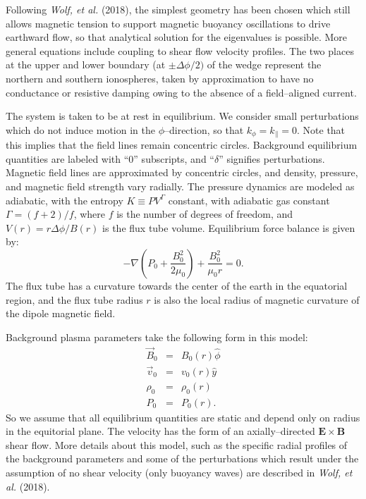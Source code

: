 \documentclass[a4paper,openany,12pt]{book}
\begin{document}
Following \emph{Wolf, et al.} (2018), the simplest geometry has been chosen which still allows magnetic tension to support magnetic buoyancy oscillations to drive earthward flow, so that analytical solution for the eigenvalues is possible. More general equations include coupling to shear flow velocity profiles. The two places at the upper and lower boundary (at $\pm\Delta\phi/2)$ of the wedge represent the northern and southern ionospheres, taken by approximation to have no conductance or resistive damping owing to the absence of a field--aligned current.

The system is taken to be at rest in equilibrium. We consider small perturbations which do not induce motion in the $\phi$--direction, so that $k_\phi=k_\|=0$. Note that this implies that the field lines remain concentric circles. Background equilibrium quantities are labeled with ``0'' subscripts, and ``$\delta$'' signifies perturbations. Magnetic field lines are approximated by concentric circles, and density, pressure, and magnetic field strength vary radially. The pressure dynamics are modeled as adiabatic, with the entropy $K\equiv PV^\Gamma$ constant, with adiabatic gas constant $\Gamma=(f+2)/f$, where $f$ is the number of degrees of freedom, and $V(r)=r\Delta\phi/B(r)$ is the flux tube volume. Equilibrium force balance is given by:
\begin{equation}
-\nabla\left(P_0+\frac{B_0^2}{2\mu_0}\right)+\frac{B_0^2}{\mu_0r}=0.\label{E9.67}
\end{equation}
The flux tube has a curvature towards the center of the earth in the equatorial region, and the flux tube radius $r$ is also the local radius of magnetic curvature of the dipole magnetic field.

Background plasma parameters take the following form in this model:
\begin{eqnarray}
\vec B_0&=&B_0(r)\widehat\phi\label{E9.68}\\
\vec v_0&=&v_0(r)\widehat y\label{E9.69}\\
\rho_0&=&\rho_0(r)\label{E9.70}\\
P_0&=&P_0(r).\label{E9.71}
\end{eqnarray}
So we assume that all equilibrium quantities are static and depend only on radius in the equitorial plane. The velocity has the form of an axially--directed $\bm{E\times B}$ shear flow. More details about this model, such as the specific radial profiles of the background parameters and some of the perturbations which result under the assumption of no shear velocity (only buoyancy waves) are described in \emph{Wolf, et al.} (2018). 
\end{document}
